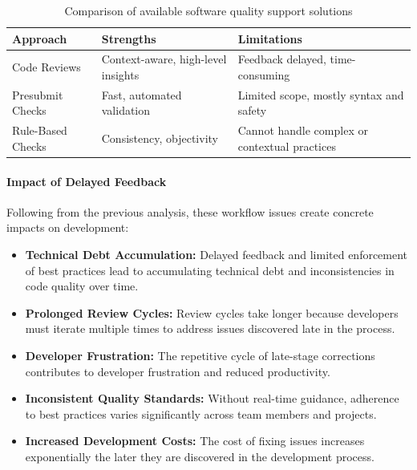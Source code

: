 \begin{spacing}{1.2}
\begin{table}[H]
\centering
\begin{tabular}{|p{4cm}|p{5cm}|p{5cm}|}
\hline
\textbf{Approach} & \textbf{Strengths} & \textbf{Limitations} \\
\hline
Code Reviews & Context-aware, high-level insights & Feedback delayed, time-consuming \\
\hline
Presubmit Checks & Fast, automated validation & Limited scope, mostly syntax and safety \\
\hline
Rule-Based Checks & Consistency, objectivity & Cannot handle complex or contextual practices \\
\hline
\end{tabular}
    \caption{Comparison of available software quality support solutions}
\label{tab:extended_solutions}
\end{table}

    
\paragraph{Impact of Delayed Feedback}
Following from the previous analysis, these workflow issues create concrete impacts on development:

\begin{itemize}
    \item \textbf{Technical Debt Accumulation:} Delayed feedback and limited enforcement of best practices lead to accumulating technical debt and inconsistencies in code quality over time.
    
    \item \textbf{Prolonged Review Cycles:} Review cycles take longer because developers must iterate multiple times to address issues discovered late in the process.
    
    \item \textbf{Developer Frustration:} The repetitive cycle of late-stage corrections contributes to developer frustration and reduced productivity.
    
    \item \textbf{Inconsistent Quality Standards:} Without real-time guidance, adherence to best practices varies significantly across team members and projects.
    
    \item \textbf{Increased Development Costs:} The cost of fixing issues increases exponentially the later they are discovered in the development process.
\end{itemize}


\end{spacing}
